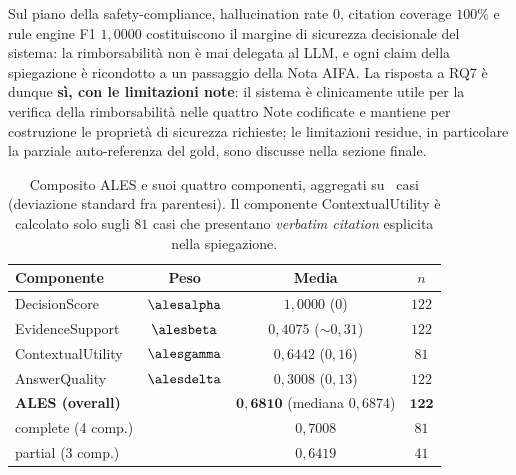 Sul piano della safety-compliance, hallucination rate $0$, citation coverage $100\%$ e rule engine F1 $1{,}0000$ costituiscono il margine di sicurezza decisionale del sistema: la rimborsabilità non è mai delegata al LLM, e ogni claim della spiegazione è ricondotto a un passaggio della Nota AIFA. La risposta a RQ7 è dunque \textbf{sì, con le limitazioni note}: il sistema è clinicamente utile per la verifica della rimborsabilità nelle quattro Note codificate e mantiene per costruzione le proprietà di sicurezza richieste; le limitazioni residue, in particolare la parziale auto-referenza del gold, sono discusse nella sezione finale.

\begin{table}[t]
  \centering
  \caption{Composito ALES e suoi quattro componenti, aggregati su \goldn\ casi (deviazione standard fra parentesi). Il componente ContextualUtility è calcolato solo sugli $81$ casi che presentano \emph{verbatim citation} esplicita nella spiegazione.}
  \label{tab:ales}
  \small
  \begin{tabular}{lccc}
    \toprule
    Componente & Peso & Media & $n$ \\
    \midrule
    DecisionScore     & $\alesalpha$ & $1{,}0000$ ($0$) & $122$ \\
    EvidenceSupport   & $\alesbeta$  & $0{,}4075$ ($\sim 0{,}31$) & $122$ \\
    ContextualUtility & $\alesgamma$ & $0{,}6442$ ($0{,}16$) & $81$ \\
    AnswerQuality     & $\alesdelta$ & $0{,}3008$ ($0{,}13$) & $122$ \\
    \midrule
    \textbf{ALES (overall)} &           & $\mathbf{0{,}6810}$ (mediana $0{,}6874$) & $\mathbf{122}$ \\
    \quad complete (4 comp.) &          & $0{,}7008$ & $81$ \\
    \quad partial (3 comp.)  &          & $0{,}6419$ & $41$ \\
    \bottomrule
  \end{tabular}
\end{table}

